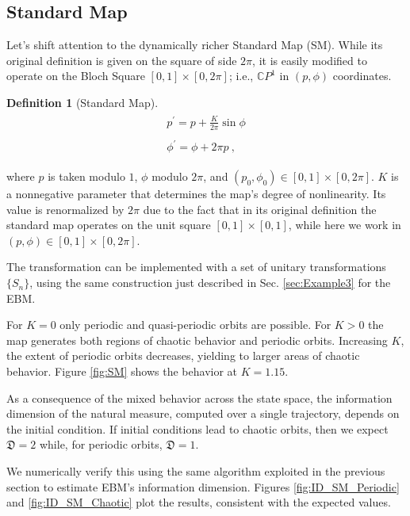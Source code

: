\documentclass[draft,nofootinbib,pre,twocolumn,showkeys,superscriptaddress,preprintnumbers,floatfix]{revtex4-1}
\newtheorem{definition}{Definition}
\newcommand{\1}{\mathbbm{1}}
\begin{document}
\subsection*{Standard Map}

Let's shift attention to the dynamically richer Standard Map (SM). While its
original definition is given on the square of side $2\pi$, it is easily
modified to operate on the Bloch Square $[0,1]\times [0,2\pi]$; i.e.,
$\mathbb{C}P^1$ in $(p,\phi)$ coordinates.

\begin{definition}[Standard Map]
\begin{align*}
\begin{array}{l}
 p^{'} = p + \frac{K}{2\pi} \sin \phi \\
 \\
\phi^{'} = \phi + 2\pi p~,
\end{array}
\end{align*}
\end{definition}
where $p$ is taken modulo $1$, $\phi$ modulo $2\pi$, and $(p_0,\phi_0) \in
[0,1]\times [0,2\pi]$. $K$ is a nonnegative parameter that determines the map's
degree of nonlinearity. Its value is renormalized by $2\pi$ due to the fact that
in its original definition the standard map operates on the unit square $[0,1]\times [0,1]$,
while here we work in $(p,\phi) \in [0,1]\times [0,2\pi]$.

The transformation can be implemented with a set of unitary transformations
$\{S_n\}$, using the same construction just described in Sec. \ref{sec:Example3}
for the EBM.

For $K=0$ only periodic and quasi-periodic orbits are possible. For $K>0$ the
map generates both regions of chaotic behavior and periodic orbits. Increasing $K$,
the extent of periodic orbits decreases, yielding to larger areas of chaotic
behavior. Figure \ref{fig:SM} shows the behavior at $K=1.15$.

As a consequence of the mixed behavior across the state space, the information
dimension of the natural measure, computed over a single trajectory, depends on
the initial condition. If initial conditions lead to chaotic orbits, then we
expect $\mathfrak{D}=2$ while, for periodic orbits, $\mathfrak{D}=1$.

We numerically verify this using the same algorithm exploited in the previous
section to estimate EBM's information dimension. Figures
\ref{fig:ID_SM_Periodic} and \ref{fig:ID_SM_Chaotic} plot the results,
consistent with the expected values.
\end{document}
